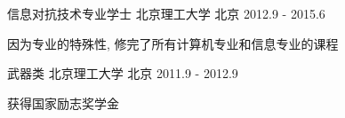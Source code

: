 

\begin{cventries}

  \cventry
    {信息对抗技术专业学士} %
    {北京理工大学} %
    {北京} %
    {2012.9 - 2015.6} %
    {
      \begin{cvitems} %
        \item {因为专业的特殊性, 修完了所有计算机专业和信息专业的课程}
      \end{cvitems}
    }

  \cventry
    {武器类} %
    {北京理工大学} %
    {北京} %
    {2011.9 - 2012.9} %
    {
      \begin{cvitems} %
        \item {获得国家励志奖学金}
      \end{cvitems}
    }



\end{cventries}
